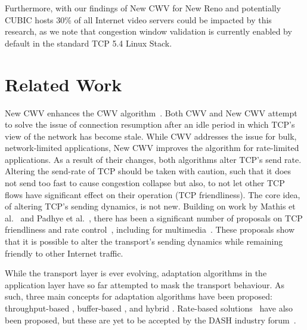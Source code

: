 \documentclass[10pt,sigconf]{acmart}
\begin{document}
 Furthermore, with our findings of New CWV for New Reno and potentially CUBIC hosts 30\% of all Internet video servers could be impacted by this research, as we note that congestion window validation is currently enabled by default in the standard TCP 5.4 Linux Stack. 


\section{Related Work}
\label{sec:related}

New CWV enhances the CWV algorithm~\cite{rfc2861-2000-padhye-congestion-window-validation}. Both CWV and New CWV attempt to solve the issue of connection resumption after an idle period in which TCP's view of the network has become stale. While CWV addresses the issue for bulk, network-limited applications, New CWV improves the algorithm for rate-limited applications. As a result of their changes, both algorithms alter TCP's send rate. Altering the send-rate of TCP should be taken with caution, such that it does not send too fast to cause congestion collapse \cite{Jacobson-1988-congestion-avoidance} but also, to not let other TCP flows have significant effect on their operation (TCP friendliness). The core idea, of altering TCP's sending dynamics, is not new. Building on work by Mathis et al.~\cite{Mathis-1997-the-macroscopic-behavior-tcp} and Padhye et al.~\cite{Padhye-1998-modelling-tcp-throughput}, there has been a significant number of proposals on TCP friendliness and rate control~\cite{rfc-5348-tfrc,Rossi-2010-ledbat,Arun-2018-copa}, including for multimedia~\cite{Carlucci-2016-Analysis-WebRTC,Choi-2007-fairer-tfrc}. These proposals show that it is possible to alter the transport's sending dynamics while remaining friendly to other Internet traffic.

While the transport layer is ever evolving, adaptation algorithms in the application layer have so far attempted to mask the transport behaviour. As such, three main concepts for adaptation algorithms have been proposed: throughput-based \cite{Sun-2016-cs2p, Jiang-2012-improving-fairness-http-video-festive}, buffer-based \cite{Spiteri-2016-BOLA,Huang-2015-A-buffer-based-approach-to-rate-adaptation-bba}, and hybrid \cite{Spiteri-2019-from-theory-to-practice-sabre,Wang-2016-squad}. Rate-based solutions~\cite{Li-2014-probe-and-adapt-panda,Liu-2011-rate-adaptation} have also been proposed, but these are yet to be accepted by the DASH industry forum~\cite{online-dashif}.
\end{document}
